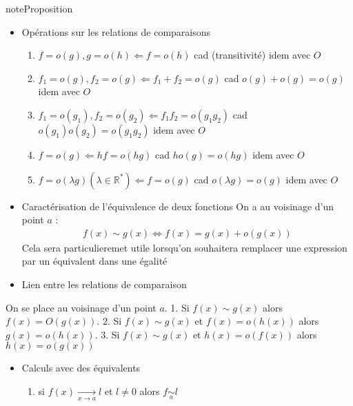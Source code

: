 \documentclass[letterpaper,10pt,french]{jupyterBook}
\begin{document}
\begin{sphinxadmonition}{note}{Proposition}
\begin{itemize}
\item {} 
\sphinxAtStartPar
Opérations sur les relations de comparaisons
\begin{enumerate}
%
\item {} 
\sphinxAtStartPar
\(f = o(g), g = o(h) \Leftarrow f = o(h)\) cad (transitivité) idem avec \(O\)

\item {} 
\sphinxAtStartPar
\(f_1 = o(g), f_2 = o(g) \Leftarrow f_1 + f_2 = o(g)\) cad \(o(g) + o(g) = o(g)\) idem avec \(O\)

\item {} 
\sphinxAtStartPar
\(f_1 = o(g_1), f_2 = o(g_2) \Leftarrow f_1f_2 = o(g_1g_2)\) cad \(o(g_1)o(g_2) = o(g_1g_2)\) idem avec \(O\)

\item {} 
\sphinxAtStartPar
\(f = o(g) \Leftarrow hf = o(hg)\) cad \(ho(g) = o(hg)\) idem avec \(O\)

\item {} 
\sphinxAtStartPar
\(f = o(\lambda g) (\lambda \in \mathbb{R}^{*}) \Leftarrow f = o(g)\) cad \( o(\lambda g) = o(g)\) idem avec \(O\)

\end{enumerate}

\item {} 
\sphinxAtStartPar
Caractérisation de l’équivalence de deux fonctions
On a au voisinage d’un point \(a\) :
\begin{equation*}
\begin{split}
    f(x) \sim g(x) \Leftrightarrow f(x) = g(x) + o(g(x))
    \end{split}
\end{equation*}
\sphinxAtStartPar
Cela sera particulieremet utile lorsqu’on souhaitera remplacer une expression par un équivalent dans une égalité

\item {} 
\sphinxAtStartPar
Lien entre les relations de comparaison

\end{itemize}

\sphinxAtStartPar
On se place au voisinage d’un point \(a\).
1. Si \(f(x) \sim g(x)\) alors \(f(x) = O(g(x))\).
2. Si \(f(x) \sim g(x)\) et \(f(x) = o(h(x))\) alors \(g(x) = o(h(x))\).
3. Si \(f(x) \sim g(x)\) et    \(h(x) = o(f(x))\) alors \(h(x) = o(g(x))\)
\begin{itemize}
\item {} 
\sphinxAtStartPar
Calculs avec des équivalents
\begin{enumerate}
%
\item {} 
\sphinxAtStartPar
si \(f(x) \underset{x\to a}{\to} l\) et \(l\neq 0\) alors \(f \underset{a}{\sim} l\)


\end{enumerate}
\end{itemize}
\end{sphinxadmonition}
\end{document}
